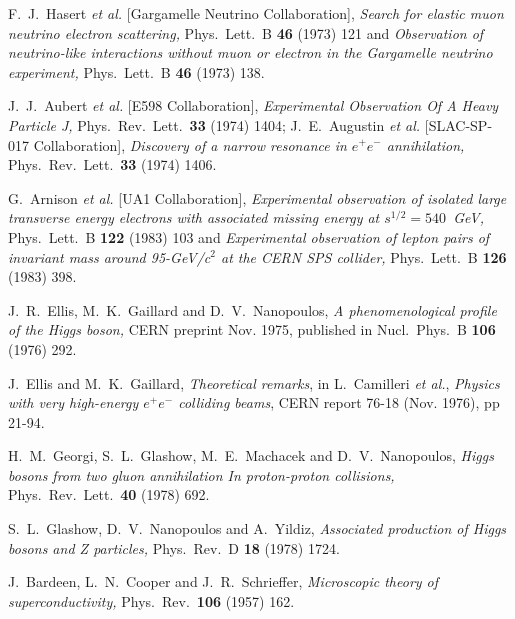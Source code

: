 \documentclass[12pt]{article}
\numberwithin{equation}{section}
\begin{document}
\begin{thebibliography}{99}
F.~J.~Hasert {\it et al.}  [Gargamelle Neutrino Collaboration],
{\it Search for elastic muon neutrino electron scattering,}
  Phys.\ Lett.\  B {\bf 46} (1973) 121 and
{\it Observation of neutrino-like interactions without muon or electron in  the
  Gargamelle neutrino experiment,}
  Phys.\ Lett.\  B {\bf 46} (1973) 138.
  
J.~J.~Aubert {\it et al.}  [E598 Collaboration],
{\it Experimental Observation Of A Heavy Particle J,}
  Phys.\ Rev.\ Lett.\  {\bf 33} (1974) 1404;
  J.~E.~Augustin {\it et al.}  [SLAC-SP-017 Collaboration],
{\it Discovery of a narrow resonance in $e^+ e^-$ annihilation,}
  Phys.\ Rev.\ Lett.\  {\bf 33} (1974) 1406.
  
G.~Arnison {\it et al.}  [UA1 Collaboration],
{\it Experimental observation of isolated large transverse energy electrons
  with associated missing energy at $s^{1/2} = 540$~GeV,}
  Phys.\ Lett.\  B {\bf 122} (1983) 103 and
{\it Experimental observation of lepton pairs of invariant mass around
95-GeV/c$^2$ at the CERN SPS collider,}
  Phys.\ Lett.\  B {\bf 126} (1983) 398.
  
J.~R.~Ellis, M.~K.~Gaillard and D.~V.~Nanopoulos,
{\it A phenomenological profile of the Higgs boson,} CERN preprint Nov. 1975, published in
  Nucl.\ Phys.\  B {\bf 106} (1976) 292.

J.~Ellis and M.~K.~Gaillard, {\it Theoretical remarks}, in L.~Camilleri {\it et al.},
{\it Physics with very high-energy $e^+ e^-$ colliding beams}, CERN report 76-18 (Nov. 1976), pp 21-94.
  
H.~M.~Georgi, S.~L.~Glashow, M.~E.~Machacek and D.~V.~Nanopoulos,
{\it Higgs bosons from two gluon annihilation In proton-proton collisions,}
  Phys.\ Rev.\ Lett.\  {\bf 40} (1978) 692.
  
S.~L.~Glashow, D.~V.~Nanopoulos and A.~Yildiz,
{\it Associated production of Higgs bosons and Z particles,}
  Phys.\ Rev.\  D {\bf 18} (1978) 1724.
  
J.~Bardeen, L.~N.~Cooper and J.~R.~Schrieffer,
{\it Microscopic theory of superconductivity,}
  Phys.\ Rev.\  {\bf 106} (1957) 162.


\end{thebibliography}
\end{document}
